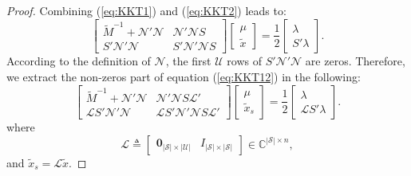 \documentclass[12pt]{article}
\newcommand{\Cb}{{\mathbb{C}}}
\newcommand{\Uc}{{\mathcal{U}}}
\newcommand{\Sc}{{\mathcal{S}}}
\newcommand{\Nc}{{\mathcal{N}}}
\newcommand{\Lc}{{\mathcal{L}}}
\newtheorem*{proof}{\textbf{Proof}}
\begin{document}
\begin{proof}
Combining (\ref{eq:KKT1}) and (\ref{eq:KKT2}) leads to:
\begin{equation}\label{eq:KKT12}
	\begin{bmatrix}
		\tilde{M}^{-1}+\Nc{'}\Nc & \Nc{'} \Nc S\\
		S{'} \Nc{'} \Nc  & S{'} \Nc{'} \Nc S
	\end{bmatrix}
	\begin{bmatrix}
		\mu \\ \tilde{x}
	\end{bmatrix}=\frac{1}{2}
	\begin{bmatrix}
		\lambda \\ S{'} \lambda 
	\end{bmatrix}.
\end{equation}
According to the definition of $\Nc$, the first $\Uc$ rows of $S{'} \Nc{'} \Nc$ are zeros. Therefore, we extract the non-zeros part of equation (\ref{eq:KKT12}) in the following:
\begin{equation}\label{eq:KKT12_nonzero}
	\begin{bmatrix}
		\tilde{M}^{-1}+\Nc{'}\Nc & \Nc{'} \Nc S \Lc{'}\\
		\Lc S{'} \Nc{'} \Nc  &  \Lc S{'} \Nc{'} \Nc S \Lc{'}
	\end{bmatrix}
	\begin{bmatrix}
		\mu \\ \tilde{x}_s
	\end{bmatrix}=\frac{1}{2}
	\begin{bmatrix}
		\lambda \\ \Lc S{'} \lambda 
	\end{bmatrix}.
\end{equation}
where 
$$\Lc\triangleq 
\begin{bmatrix}
	\mathbf{0}_{|\Sc|\times|\Uc|} & I_{|\Sc|\times|\Sc|}
\end{bmatrix}
\in \Cb^{|\Sc|\times n },
$$
and $\tilde{x}_s=\Lc \tilde{x}$.



\end{proof}
\end{document}
